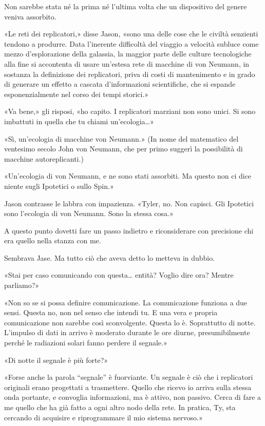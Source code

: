 Non sarebbe stata né la prima né l'ultima volta che un dispositivo del
genere veniva assorbito.

«Le reti dei replicatori,» disse Jason, «sono una delle cose che le
civiltà senzienti tendono a produrre. Data l'inerente difficoltà del
viaggio a velocità subluce come mezzo d'esplorazione della galassia, la
maggior parte delle culture tecnologiche alla fine si accontenta di
usare un'estesa rete di macchine di von Neumann, in sostanza la
definizione dei replicatori, priva di costi di mantenimento e in grado
di generare un effetto a cascata d'informazioni scientifiche, che si
espande esponenzialmente nel corso dei tempi storici.»

«Va bene,» gli risposi, «ho capito. I replicatori marziani non sono
unici. Si sono imbattuti in quella che tu chiami un'ecologia\ldots»

«Sì, un'ecologia di macchine von Neumann.» (In nome del matematico del
ventesimo secolo John von Neumann, che per primo suggerì la possibilità
di macchine autoreplicanti.)

«Un'ecologia di von Neumann, e ne sono stati assorbiti. Ma questo non ci
dice niente sugli Ipotetici o sullo Spin.»

Jason contrasse le labbra con impazienza. «Tyler, no. Non capisci. Gli
Ipotetici sono l'ecologia di von Neumann. Sono la stessa cosa.»

\separatorefiori

A questo punto dovetti fare un passo indietro e riconsiderare con
precisione chi era quello nella stanza con me.

Sembrava Jase. Ma tutto ciò che aveva detto lo metteva in dubbio.

«Stai per caso comunicando con questa\ldots{} entità? Voglio dire ora?
Mentre parliamo?»

«Non so se si possa definire comunicazione. La comunicazione funziona a
due sensi. Questa no, non nel senso che intendi tu. E una vera e propria
comunicazione non sarebbe così sconvolgente. Questa lo è. Soprattutto di
notte. L'impulso di dati in arrivo è moderato durante le ore diurne,
presumibilmente perché le radiazioni solari fanno perdere il segnale.»

«Di notte il segnale è più forte?»

«Forse anche la parola ``segnale'' è fuorviante. Un segnale è ciò che i
replicatori originali erano progettati a trasmettere. Quello che ricevo
io arriva sulla stessa onda portante, e convoglia informazioni, ma è
attivo, non passivo. Cerca di fare a me quello che ha già fatto a ogni
altro nodo della rete. In pratica, Ty, sta cercando di acquisire e
riprogrammare il mio sistema nervoso.»

